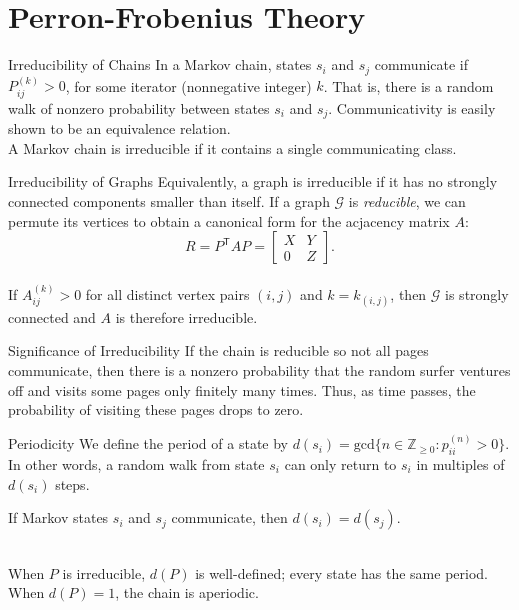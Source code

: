 \documentclass{beamer}
\newcommand{\iter}[2]{#1^{(#2)}}
\newcommand{\transpose}[1]{#1^{\mathsf{T}}}
\newcommand{\iter}[2]{#1^{(#2)}}
\begin{document}
\section{Perron-Frobenius Theory}
\begin{frame}{Irreducibility of Chains}
    In a Markov chain, states $s_i$ and $s_j$ communicate if $\iter{P}{k}_{ij} > 0$, for some iterator (nonnegative integer) $k$. That is, there is a random walk of nonzero probability between states $s_i$ and $s_j$. Communicativity is easily shown to be an equivalence relation.\\
    \vspace{2mm}
    A Markov chain is irreducible if it contains a single communicating class.
\end{frame}

\begin{frame}{Irreducibility of Graphs}
    Equivalently, a graph is irreducible if it has no strongly connected components smaller than itself. If a graph $\mathcal{G}$ is \textit{reducible}, we can permute its vertices to obtain a canonical form for the acjacency matrix $A$:
    \begin{equation*}
	    R = \transpose{P} A P = 
	    \begin{bmatrix}
		    X & Y \\
		    0 & Z
	    \end{bmatrix}.
	\end{equation*} \\
	\vspace{2mm}
	If $\iter{A}{k}_{ij} > 0$ for all distinct vertex pairs $(i,j)$ and $k = k_{(i,j)}$, then $\mathcal{G}$ is strongly connected and $A$ is therefore irreducible.
\end{frame}

\begin{frame}{Significance of Irreducibility}
    If the chain is reducible so not all pages communicate, then there is a nonzero probability that the random surfer ventures off and visits some pages only finitely many times. Thus, as time passes, the probability of visiting these pages drops to zero.
\end{frame}

\begin{frame}{Periodicity}
    We define the period of a state by $d(s_i)=\text{gcd}\{n\in \mathbb{Z}_{\geq 0} : \iter{p}{n}_{ii} > 0 \}$. In other words, a random walk from state $s_i$ can only return to $s_i$ in multiples of $d(s_i)$ steps. \\
    \begin{theorem}
        If Markov states $s_i$ and $s_j$ communicate, then $d(s_i) = d(s_j)$.
    \end{theorem}\\
    \vspace{2mm}
     When $P$ is irreducible, $d(P)$ is well-defined; every state has the same period. When $d(P) = 1$, the chain is aperiodic.
\end{frame}
\end{document}
